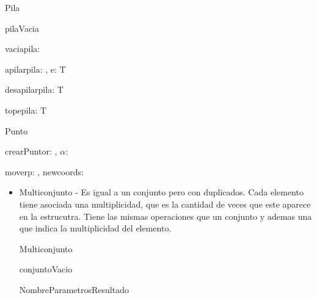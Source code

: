 \documentclass[10pt,a4paper]{article}
\begin{document}
\begin{tad}{Pila}
    \begin{proc}{pilaVacia}{}{\nt}
    \end{proc}
    \begin{proc}{vacia}{\In pila: \nt}{\bool}
    \end{proc}
    \begin{proc}{apilar}{\Inout pila: \nt, \In e: T}{}
    \end{proc}
    \begin{proc}{desapilar}{\Inout pila: \nt}{T}
    \end{proc}
    \begin{proc}{tope}{\In pila: \nt}{T}
    \end{proc}
\end{tad}
\begin{tad}{Punto}
    \begin{proc}{crearPunto}{\In r: \float, \In $\alpha$: \float}{\nt}
    \end{proc}
    \begin{proc}{mover}{\Inout p: \nt, \In newcoords: \slr{\float\times\float}}{}
    \end{proc}
\end{tad}
\begin{itemize}
    \item Multiconjunto -  Es igual a un conjunto pero con duplicados. Cada elemento tiene asociada una multiplicidad,
     que es la cantidad de veces que este aparece en la estrucutra. Tiene las mismas operaciones que un conjunto y ademas una que 
     indica la multiplicidad del elemento.
     \begin{tad}{Multiconjunto}
         \begin{proc}{conjuntoVacio}{}{\nt}
         \end{proc}
         \begin{proc}{Nombre}{Parametros}{Resultado}
         \end{proc}
     \end{tad}
\end{itemize}
\end{document}
